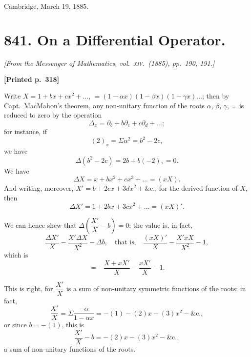 \documentclass[11pt]{article}
\begin{document}
\medskip

\hfill Cambridge, March 19, 1885.

\bigskip
\bigskip


\section*{841. On a Differential Operator.}

\smallskip
\noindent\textit{[From the Messenger of Mathematics, vol.\ \textsc{xiv}.\ (1885), pp.\ 190, 191.]}

\medskip

\noindent\textbf{[Printed p.~318]}\hfill

Write $X = 1 + bx + cx^{2} + \ldots$, $= (1-\alpha x)(1-\beta x)(1-\gamma x)\ldots$; then by Capt.\ MacMahon's theorem, any non-unitary function of the roots $\alpha$, $\beta$, $\gamma$, \ldots\ is reduced to zero by the operation
\[
\Delta_{x} = \partial_{b} + b\partial_{c} + c\partial_{d} + \ldots;
\]
for instance, if
\[
(2)_{x} = \Sigma \alpha^{2} = b^{2} - 2c,
\]
we have
\[
\Delta(b^{2} - 2c) = 2b + b(-2), = 0.
\]
We have
\[
\Delta X = x + bx^{2} + cx^{3} + \ldots = (xX).
\]
And writing, moreover, $X' = b + 2cx + 3dx^{2} + \&\mathrm{c}$., for the derived function of $X$, then
\[
\Delta X' = 1 + 2bx + 3cx^{2} + \ldots = (xX)'.
\]

We can hence shew that $\Delta\!\left(\dfrac{X'}{X}-b\right) = 0$; the value is, in fact,
\[
\frac{\Delta X'}{X} - \frac{X' \Delta X}{X^{2}} - \Delta b, \quad \text{that is,} \quad \frac{(xX)'}{X} - \frac{X' xX}{X^{2}} - 1,
\]
which is
\[
= -\frac{X + xX'}{X} - \frac{xX'}{X} - 1.
\]

This is right, for $\dfrac{X'}{X}$ is a sum of non-unitary symmetric functions of the roots; in fact,
\[
\frac{X'}{X} = \Sigma\frac{-\alpha}{1 - \alpha x} = -(1) - (2)x - (3)x^{2} - \&\mathrm{c}.,
\]
or since $b = -(1)$, this is
\[
\frac{X'}{X} - b = -(2)x - (3)x^{2} - \&\mathrm{c}.,
\]
a sum of non-unitary functions of the roots.

\bigskip
\bigskip

\end{document}

